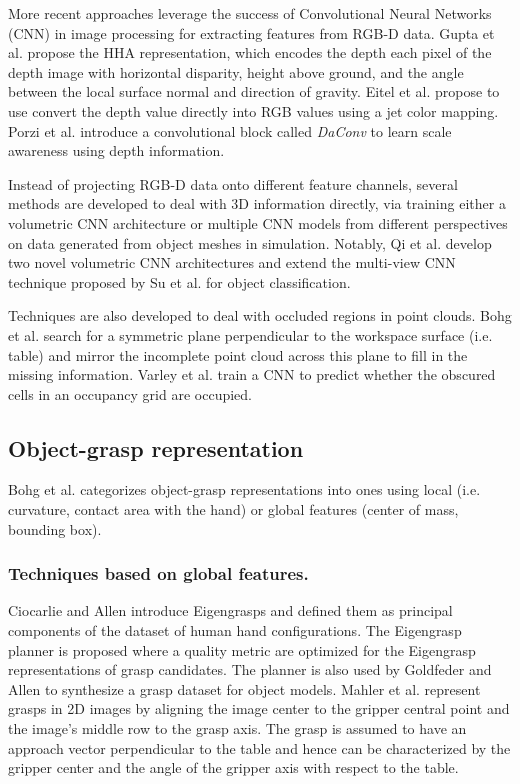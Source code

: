 \documentclass[runningheads]{../llncs}
\begin{document}
More recent approaches leverage the success of Convolutional Neural Networks (CNN) in image processing for extracting
features from RGB-D data. Gupta et al. \cite{Gupta2014RGBDFeatures} propose the HHA representation, which encodes the
depth each pixel of the depth image with horizontal disparity, height above ground, and the angle between the local
surface normal and direction of gravity. Eitel et al. \cite{Eitel2015} propose to use convert the depth value directly
into RGB values using a jet color mapping. Porzi et al. \cite{Porzi2017} introduce a convolutional block called
\emph{DaConv} to learn scale awareness using depth information.

Instead of projecting RGB-D data onto different feature channels, several methods are developed to deal with 3D
information directly, via training either a volumetric CNN architecture or multiple CNN models from different
perspectives on data generated from object meshes in simulation. Notably, Qi et al. \cite{Qi2016} develop two novel
volumetric CNN architectures and extend the multi-view CNN technique proposed by Su et al. \cite{Su2015} for object
classification.

Techniques are also developed to deal with occluded regions in point clouds. Bohg et al. \cite{Bohg2011MindTheGap}
search for a symmetric plane perpendicular to the workspace surface (i.e. table) and mirror the incomplete point cloud
across this plane to fill in the missing information. Varley et al. \cite{Varley2017} train a CNN to predict whether
the obscured cells in an occupancy grid are occupied.

\subsection{Object-grasp representation}
Bohg et al. categorizes object-grasp representations into ones using local (i.e. curvature, contact area with the hand)
or global features (center of mass, bounding box).

\subsubsection{Techniques based on global features.}

Ciocarlie and Allen \cite{Ciocarlie2009} introduce Eigengrasps and defined them as principal components of the dataset
of human hand configurations. The Eigengrasp planner is proposed where a quality metric are optimized for the Eigengrasp
representations of grasp candidates. The planner is also used by Goldfeder and Allen \cite{Goldfeder2011} to synthesize
a grasp dataset for object models. Mahler et al. \cite{mahler2017} represent grasps in 2D images by aligning the image
center to the gripper central point and the image's middle row to the grasp axis. The grasp is assumed to have an
approach vector perpendicular to the table and hence can be characterized by the gripper center and the angle of the
gripper axis with respect to the table.
\end{document}
